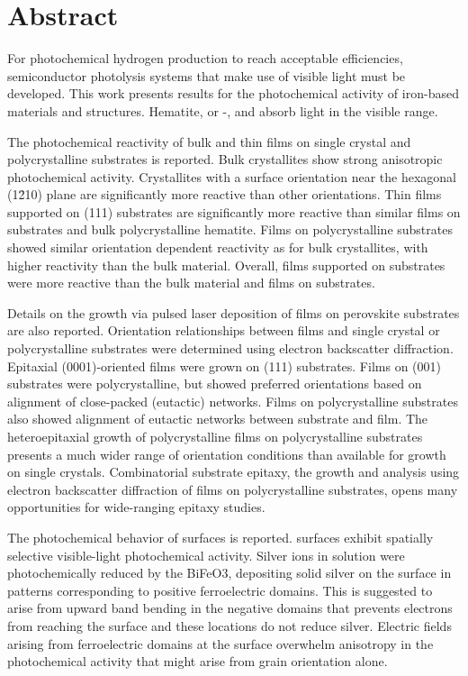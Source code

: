 \chapter{Abstract}

For photochemical hydrogen production to reach acceptable efficiencies, semiconductor
photolysis systems that make use of visible light must be developed. This work presents
results for the photochemical activity of iron-based materials and structures. Hematite,
or \textalpha-, and  absorb light in the visible range. 

The photochemical reactivity of bulk  and thin  films on single
crystal and polycrystalline substrates is reported. Bulk  crystallites show
strong anisotropic photochemical activity. Crystallites with a surface orientation near
the hexagonal (1\={2}10) plane are significantly more reactive than other orientations.
Thin  films supported on  (111) substrates are significantly more
reactive than similar films on  substrates and bulk polycrystalline hematite.
Films on polycrystalline substrates showed similar orientation dependent reactivity as for
bulk  crystallites, with higher reactivity than the bulk material.
Overall, films supported on  substrates were more reactive than the bulk
material and films on  substrates.

Details on the growth via pulsed laser deposition of  films on perovskite
 substrates are also reported. Orientation relationships between films and
single crystal or polycrystalline substrates were determined using electron backscatter
diffraction. Epitaxial (0001)-oriented films were grown on  (111) substrates.
Films on  (001) substrates were polycrystalline, but showed preferred
orientations based on alignment of close-packed (eutactic) networks. Films on
polycrystalline  substrates also showed alignment of eutactic networks between
substrate and film. The heteroepitaxial growth of polycrystalline films on polycrystalline
substrates presents a much wider range of orientation conditions than available for growth
on single crystals. Combinatorial substrate epitaxy, the growth and analysis using
electron backscatter diffraction of films on polycrystalline substrates, opens many
opportunities for wide-ranging epitaxy studies. 

The photochemical behavior of  surfaces is reported.  surfaces exhibit
spatially selective visible-light photochemical activity. Silver ions in solution were
photochemically reduced by the BiFeO3, depositing solid silver on the surface in patterns
corresponding to positive ferroelectric domains. This is suggested to arise from upward
band bending in the negative domains that prevents electrons from reaching the surface and
these locations do not reduce silver. Electric fields arising from ferroelectric domains
at the surface overwhelm anisotropy in the photochemical activity that might arise from
grain orientation alone.